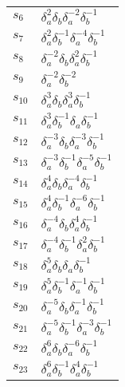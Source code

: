 \documentclass{article}
\begin{document}
\begin{center}
\begin{tabular}{ll}
$s_{6}$ & $\delta_a^{2}\delta_b^{}\delta_a^{-2}\delta_b^{-1}$ \\
$s_{7}$ & $\delta_a^{2}\delta_b^{-1}\delta_a^{-4}\delta_b^{-1}$ \\
$s_{8}$ & $\delta_a^{-2}\delta_b^{}\delta_a^{2}\delta_b^{-1}$ \\
$s_{9}$ & $\delta_a^{-2}\delta_b^{-2}$ \\
$s_{10}$ & $\delta_a^{3}\delta_b^{}\delta_a^{3}\delta_b^{-1}$ \\
$s_{11}$ & $\delta_a^{3}\delta_b^{-1}\delta_a^{}\delta_b^{-1}$ \\
$s_{12}$ & $\delta_a^{-3}\delta_b^{}\delta_a^{-3}\delta_b^{-1}$ \\
$s_{13}$ & $\delta_a^{-3}\delta_b^{-1}\delta_a^{-5}\delta_b^{-1}$ \\
$s_{14}$ & $\delta_a^{4}\delta_b^{}\delta_a^{-4}\delta_b^{-1}$ \\
$s_{15}$ & $\delta_a^{4}\delta_b^{-1}\delta_a^{-6}\delta_b^{-1}$ \\
$s_{16}$ & $\delta_a^{-4}\delta_b^{}\delta_a^{4}\delta_b^{-1}$ \\
$s_{17}$ & $\delta_a^{-4}\delta_b^{-1}\delta_a^{2}\delta_b^{-1}$ \\
$s_{18}$ & $\delta_a^{5}\delta_b^{}\delta_a^{}\delta_b^{-1}$ \\
$s_{19}$ & $\delta_a^{5}\delta_b^{-1}\delta_a^{-1}\delta_b^{-1}$ \\
$s_{20}$ & $\delta_a^{-5}\delta_b^{}\delta_a^{-1}\delta_b^{-1}$ \\
$s_{21}$ & $\delta_a^{-5}\delta_b^{-1}\delta_a^{-3}\delta_b^{-1}$ \\
$s_{22}$ & $\delta_a^{6}\delta_b^{}\delta_a^{-6}\delta_b^{-1}$ \\
$s_{23}$ & $\delta_a^{6}\delta_b^{-1}\delta_a^{4}\delta_b^{-1}$ \\
\bottomrule
\end{tabular}
\end{center}

\thispagestyle{empty}
\end{document}
